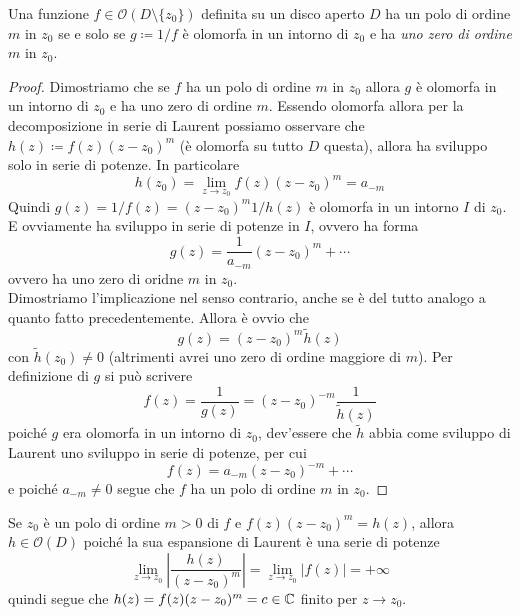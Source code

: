 \begin{proposition}
  Una funzione $f \in \mathcal{O}(D \setminus \{z_0\})$ definita su un disco
  aperto $D$ ha un polo di ordine $m$ in $z_0$ se e solo se $g \coloneqq 1/f$ 
  è olomorfa in un intorno di $z_0$ e ha \emph{uno zero di ordine $m$} in $z_0$.
  \label{prp:caratterizzazione_poli}
\end{proposition}
\begin{proof}
  Dimostriamo che se $f$ ha un polo di ordine $m$ in $z_0$ allora $g$ è olomorfa in un
  intorno di $z_0$ e ha uno zero di ordine $m$. Essendo olomorfa allora per la
  decomposizione in serie di Laurent possiamo osservare che $h(z) \coloneqq
  f(z)(z-z_0)^m$ (è olomorfa su tutto $D$ questa), allora ha sviluppo solo in serie 
  di potenze. In particolare   
  \begin{equation*}
    h(z_0) = \lim_{z \to z_0} f(z)(z-z_0)^{m} = a_{-m}  
  \end{equation*}
  Quindi $g(z) = 1/f(z) = (z-z_0)^m 1/h(z)$ è olomorfa in un intorno $I$ di $z_0$.
  E ovviamente ha sviluppo in serie di potenze in $I$, ovvero ha forma
  \begin{equation*}
    g(z) = \frac{1}{a_{-m}} (z-z_0)^{m} + \cdots
  \end{equation*}
  ovvero ha uno zero di oridne $m$ in $z_0$.\\

  Dimostriamo l'implicazione nel senso contrario, anche se è del tutto analogo
  a quanto fatto precedentemente. Allora è ovvio che 
  \begin{equation*}
    g(z) = (z-z_0)^m \tilde{h}(z)
  \end{equation*}
  con $\tilde{h}(z_0) \neq 0$ (altrimenti avrei uno zero di ordine maggiore di
  $m$). Per definizione di $g$ si può scrivere 
  \begin{equation*}
    f(z) = \frac{1}{g(z)} = (z-z_0)^{-m} \frac{1}{\tilde{h}(z)}
  \end{equation*}
  poiché $g$ era olomorfa in un intorno di $z_0$, dev'essere che $\tilde{h}$
  abbia come sviluppo di Laurent uno sviluppo in serie di potenze, per cui 
  \begin{equation*}
    f(z) = a_{-m} (z-z_0)^{-m} + \cdots
  \end{equation*}
  e poiché $a_{-m} \neq 0$ segue che $f$ ha un polo di ordine $m$ in $z_0$.
\end{proof}

\begin{remark}
  Se $z_0$ è un polo di ordine $m > 0$ di $f$ e $f(z)(z-z_0)^m = h(z)$, allora
  $h \in \mathcal{O}(D)$ poiché la sua espansione di Laurent è una serie di
  potenze  
  \begin{equation*}
    \lim_{z\to z_0} \left|\frac{h(z)}{(z-z_0)^m}\right| = \lim_{z\to z_0} |f(z)|
    = + \infty
  \end{equation*}
  quindi segue che $h(z) = f(z)(z-z_0)^m = c \in \mathbb{C}$ finito per $z \to z_0$. 
  \label{rmk:limitatezza_tolto_il_polo}
\end{remark}

